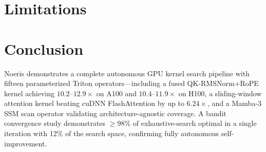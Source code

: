 \documentclass{article}
\begin{document}
\section{Limitations}
\label{sec:limitations}


\section{Conclusion}
\label{sec:conclusion}


Noeris demonstrates a complete autonomous GPU kernel search pipeline with
fifteen parameterized Triton operators---including a fused QK-RMSNorm+RoPE
kernel achieving $10.2\text{--}12.9\times$ on A100 and
$10.4\text{--}11.9\times$ on H100, a sliding-window attention kernel beating
cuDNN FlashAttention by up to $6.24\times$, and a Mamba-3 SSM scan operator
validating architecture-agnostic coverage. A bandit convergence study
demonstrates $\geq$98\% of exhaustive-search optimal in a single iteration with
12\% of the search space, confirming fully autonomous self-improvement.


\end{document}
